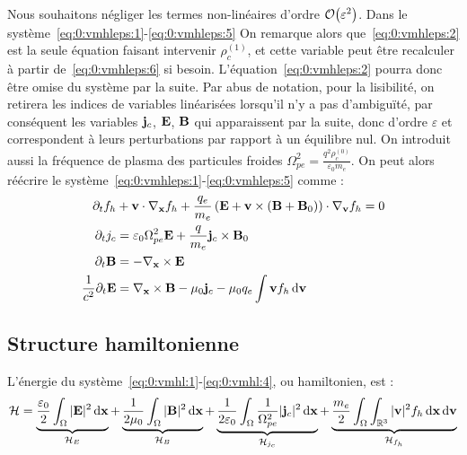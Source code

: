 Nous souhaitons négliger les termes non-linéaires d'ordre $\order{\varepsilon^2}$. Dans le système~\eqref{eq:0:vmhleps:1}-\eqref{eq:0:vmhleps:5} On remarque alors que~\eqref{eq:0:vmhleps:2} est la seule équation faisant intervenir $\rho_c^{(1)}$, et cette variable peut être recalculer à partir de~\eqref{eq:0:vmhleps:6} si besoin. L'équation~\eqref{eq:0:vmhleps:2} pourra donc être omise du système par la suite. Par abus de notation, pour la lisibilité, on retirera les indices de variables linéarisées lorsqu'il n'y a pas d'ambiguïté, par conséquent les variables $\vb{j}_c$, $\vb{E}$, $\vb{B}$ qui apparaissent par la suite, donc d'ordre $\varepsilon$ et correspondent à leurs perturbations par rapport à un équilibre nul. On introduit aussi la fréquence de plasma des particules froides $\Omega_{pe}^2 = \frac{q^2\rho_c^{(0)}}{\varepsilon_0m_e}$. On peut alors réécrire le système~\eqref{eq:0:vmhleps:1}-\eqref{eq:0:vmhleps:5} comme :
\begin{align}
	\label{eq:0:vmhl:1}
		\partial_t f_h &+ \vb{v}\cdot\nabla_{\vb{x}} f_h + \frac{q_e}{m_e}\left( \vb{E} + \vb{v}\times(\vb{B}+\vb{B}_0) \right)\cdot\nabla_{\vb{v}} f_h = 0 \\
	\label{eq:0:vmhl:2}
		\partial_t j_c &= \varepsilon_0\Omega_{pe}^2\vb{E} + \frac{q}{m_e}\vb{j}_c\times\vb{B}_0 \\
	\label{eq:0:vmhl:3}
		\partial_t\vb{B} &= -\nabla_{\vb{x}}\times\vb{E} \\
	\label{eq:0:vmhl:4}
		\frac{1}{c^2}\partial_t\vb{E} &= \nabla_{\vb{x}}\times\vb{B} - \mu_0\vb{j}_c - \mu_0q_e\int\vb{v}f_h\dd{\vb{v}}
\end{align}


\subsection{Structure hamiltonienne}

L'énergie du système~\eqref{eq:0:vmhl:1}-\eqref{eq:0:vmhl:4}, ou hamiltonien, est :
\begin{equation}
  \mathcal{H} = \underbrace{\frac{\varepsilon_0}{2} \int_{\Omega} |\vb{E}|^2 \dd{\vb{x}} }_{\mathcal{H}_E}
              + \underbrace{\frac{1}{2\mu_0}        \int_{\Omega} |\vb{B}|^2 \dd{\vb{x}} }_{\mathcal{H}_B}
              + \underbrace{\frac{1}{2\varepsilon_0}\int_{\Omega} \frac{1}{\Omega_{pe}^2}|\vb{j}_c|^2 \dd{\vb{x}} }_{\mathcal{H}_{j_c}}
              + \underbrace{\frac{m_e}{2}           \int_{\Omega}\int_{\mathbb{R}^3} |\vb{v}|^2f_h \dd{\vb{x}}\dd{\vb{v}} }_{\mathcal{H}_{f_h}}
\end{equation}























